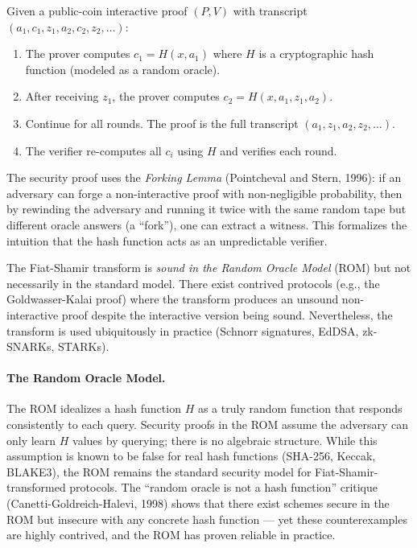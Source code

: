 \begin{definition}
Given a public-coin interactive proof $(P,V)$ with transcript $(a_1, c_1, z_1, a_2, c_2, z_2, \dots)$:
\begin{enumerate}
\item The prover computes $c_1 = H(x, a_1)$ where $H$ is a cryptographic hash function (modeled as a random oracle).
\item After receiving $z_1$, the prover computes $c_2 = H(x, a_1, z_1, a_2)$.
\item Continue for all rounds. The proof is the full transcript $(a_1, z_1, a_2, z_2, \dots)$.
\item The verifier re-computes all $c_i$ using $H$ and verifies each round.
\end{enumerate}
\end{definition}

The security proof uses the \emph{Forking Lemma} (Pointcheval and Stern, 1996): if an adversary can forge a non-interactive proof with non-negligible probability, then by rewinding the adversary and running it twice with the same random tape but different oracle answers (a ``fork''), one can extract a witness. This formalizes the intuition that the hash function acts as an unpredictable verifier.

The Fiat-Shamir transform is \emph{sound in the Random Oracle Model} (ROM) but not necessarily in the standard model. There exist contrived protocols (e.g., the Goldwasser-Kalai proof) where the transform produces an unsound non-interactive proof despite the interactive version being sound. Nevertheless, the transform is used ubiquitously in practice (Schnorr signatures, EdDSA, zk-SNARKs, STARKs).

\paragraph{The Random Oracle Model.} The ROM idealizes a hash function $H$ as a truly random function that responds consistently to each query. Security proofs in the ROM assume the adversary can only learn $H$ values by querying; there is no algebraic structure. While this assumption is known to be false for real hash functions (SHA-256, Keccak, BLAKE3), the ROM remains the standard security model for Fiat-Shamir-transformed protocols. The ``random oracle is not a hash function'' critique (Canetti-Goldreich-Halevi, 1998) shows that there exist schemes secure in the ROM but insecure with any concrete hash function --- yet these counterexamples are highly contrived, and the ROM has proven reliable in practice.

